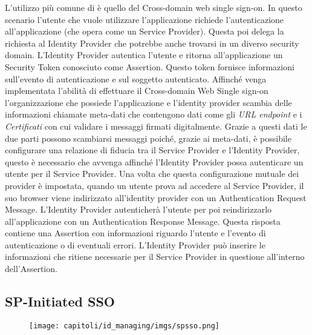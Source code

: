 L'utilizzo più comune di \saml{} è quello del Cross-domain web single sign-on.
In questo scenario l'utente che vuole utilizzare l'applicazione richiede l'autenticazione
all'applicazione (che opera come un \saml{} Service Provider). Questa poi delega la
richiesta al \saml{} Identity Provider che potrebbe anche trovarsi in un diverso
security domain. L'Identity Provider autentica l'utente e ritorna all'applicazione
un Security Token conosciuto come \saml{} Assertion. Questo token fornisce informazioni
sull'evento di autenticazione e sul soggetto autenticato. Affinché  venga implementata
l'abilità di effettuare il Cross-domain Web Single sign-on l'organizzazione che possiede
l'applicazione e l'identity provider scambia delle informazioni chiamate meta-dati
che contengono dati come gli \textit{URL endpoint} e i \textit{Certificati}
con cui validare i messaggi firmati digitalmente. Grazie a questi dati le due parti
possono scambiarsi messaggi poiché, grazie ai meta-dati, è possibile configurare
una relazione di fiducia tra il Service Provider e l'Identity Provider, questo è
necessario che avvenga affinché l'Identity Provider possa autenticare un utente
per il Service Provider. Una volta che questa configurazione mutuale dei provider
è impostata, quando un utente prova ad accedere al Service Provider, il suo
browser viene indirizzato all'identity provider con un \saml{} Authentication Request
Message. L'Identity Provider autenticherà l'utente per poi reindirizzarlo
all'applicazione con un \saml{} Authentication Response Message. Questa risposta
contiene una \saml{} Assertion con informazioni riguardo l'utente e l'evento di
autenticazione o di eventuali errori. L'Identity Provider può inserire le informazioni
che ritiene necessarie per il Service Provider in questione
all'interno dell'Assertion.

\subsection{SP-Initiated SSO}

\begin{figure}[H]
      \centering
      \texttt{[image: capitoli/id\_managing/imgs/spsso.png]}
\end{figure}

